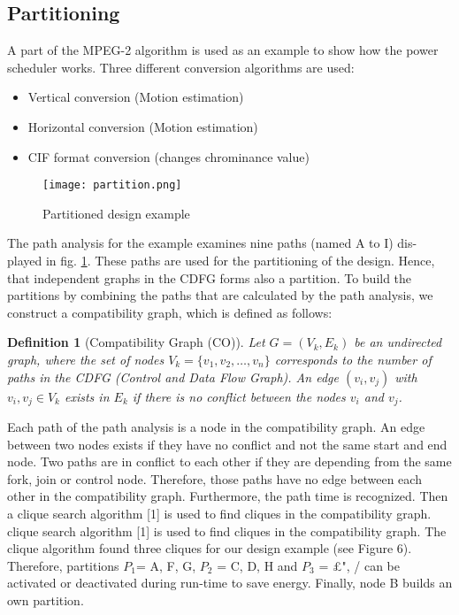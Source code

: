 \documentclass[conference]{IEEEtran}
\newtheorem{definition}{Definition}
\begin{document}
\subsection{Partitioning}
\label{subsec: partitioning}
A part of the MPEG-2 algorithm is used as an example to show how the power scheduler works. Three different conversion algorithms are used:
\begin{itemize}
    \item Vertical conversion (Motion estimation)
    \item Horizontal conversion (Motion estimation)
    \item CIF format conversion (changes chrominance value)
\end{itemize}

\begin{figure}[h!]
    \centering
    \texttt{[image: partition.png]}
    \caption{Partitioned design example}
    \label{fig:partition}
\end{figure}

The path analysis for the example examines nine paths (named A to I) dis- played in fig. \ref{fig:partition}. These paths are used for the partitioning of the design. Hence, that independent graphs in the CDFG forms also a partition. To build the partitions by combining the paths that are calculated by the path analysis, we construct a compatibility graph, which is defined as follows:

\begin{definition}[Compatibility Graph (CO)]
\label{def:compatibility}
Let $G = (V_k, E_k)$ be an undirected graph, where the set of nodes $V_k = \{v_1, v_2, \ldots, v_n\}$ corresponds to the number of paths in the CDFG (Control and Data Flow Graph). An edge $(v_i, v_j)$ with $v_i, v_j \in V_k$ exists in $E_k$ if there is no conflict between the nodes $v_i$ and $v_j$.
\end{definition}

Each path of the path analysis is a node in the compatibility graph. An edge between two nodes exists if they have no conflict and not the same start and end node. Two paths are in conflict to each other if they are depending from the same fork, join or control node. Therefore, those paths have no edge between each other in the compatibility graph. Furthermore, the path time is recognized. Then a clique search algorithm [1] is used to find cliques in the compatibility graph. clique search algorithm [1] is used to find cliques in the compatibility graph. The clique algorithm found three cliques for our design example (see Figure 6). Therefore, partitions  $P_1$= {A, F, G}, $P_2$ = {C, D, H} and $P_3$ = {£", /} can be activated or deactivated during run-time to save energy. Finally, node B builds an own partition.
\end{document}
